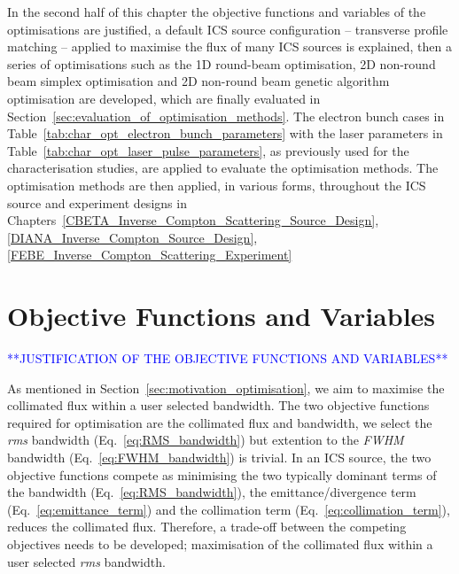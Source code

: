 \documentclass[../main.tex]{subfiles}
\begin{document}
In the second half of this chapter the objective functions and variables of the optimisations are justified, a default ICS source configuration -- transverse profile matching -- applied to maximise the flux of many ICS sources is explained, then a series of optimisations such as the 1D round-beam optimisation, 2D non-round beam simplex optimisation and 2D non-round beam genetic algorithm optimisation are developed, which are finally evaluated in Section~\ref{sec:evaluation_of_optimisation_methods}. The electron bunch cases in Table~\ref{tab:char_opt_electron_bunch_parameters} with the laser parameters in Table~\ref{tab:char_opt_laser_pulse_parameters},  as previously used for the characterisation studies, are applied to evaluate the optimisation methods. The optimisation methods are then applied, in various forms, throughout the ICS source and experiment designs in Chapters~\ref{CBETA_Inverse_Compton_Scattering_Source_Design}, \ref{DIANA_Inverse_Compton_Source_Design}, \ref{FEBE_Inverse_Compton_Scattering_Experiment}    

\section{Objective Functions and Variables}
\label{sec:objective_functions_and_variables}

\textcolor{blue}{**JUSTIFICATION OF THE OBJECTIVE FUNCTIONS AND VARIABLES**}

As mentioned in Section~\ref{sec:motivation_optimisation}, we aim to maximise the collimated flux within a user selected bandwidth. The two objective functions required for optimisation are the collimated flux and bandwidth, we select the \textit{rms} bandwidth (Eq.~\ref{eq:RMS_bandwidth}) but extention to the \textit{FWHM} bandwidth (Eq.~\ref{eq:FWHM_bandwidth}) is trivial. In an ICS source, the two objective functions compete as minimising the two typically dominant terms of the  bandwidth (Eq.~\ref{eq:RMS_bandwidth}), the emittance/divergence term (Eq.~\ref{eq:emittance_term}) and the collimation term (Eq.~\ref{eq:collimation_term}), reduces the collimated flux. Therefore, a trade-off between the competing objectives needs to be developed; maximisation of the collimated flux within a user selected \textit{rms} bandwidth. 
\end{document}
